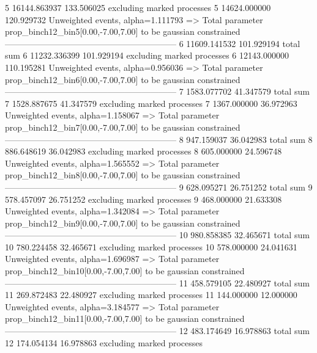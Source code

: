5          16144.863937    133.506025      excluding marked processes    
5          14624.000000    120.929732      Unweighted events, alpha=1.111793
  => Total parameter prop_binch12_bin5[0.00,-7.00,7.00] to be gaussian constrained
------------------------------------------------------------
6          11609.141532    101.929194      total sum                     
6          11232.336399    101.929194      excluding marked processes    
6          12143.000000    110.195281      Unweighted events, alpha=0.956036
  => Total parameter prop_binch12_bin6[0.00,-7.00,7.00] to be gaussian constrained
------------------------------------------------------------
7          1583.077702     41.347579       total sum                     
7          1528.887675     41.347579       excluding marked processes    
7          1367.000000     36.972963       Unweighted events, alpha=1.158067
  => Total parameter prop_binch12_bin7[0.00,-7.00,7.00] to be gaussian constrained
------------------------------------------------------------
8          947.159037      36.042983       total sum                     
8          886.648619      36.042983       excluding marked processes    
8          605.000000      24.596748       Unweighted events, alpha=1.565552
  => Total parameter prop_binch12_bin8[0.00,-7.00,7.00] to be gaussian constrained
------------------------------------------------------------
9          628.095271      26.751252       total sum                     
9          578.457097      26.751252       excluding marked processes    
9          468.000000      21.633308       Unweighted events, alpha=1.342084
  => Total parameter prop_binch12_bin9[0.00,-7.00,7.00] to be gaussian constrained
------------------------------------------------------------
10         980.858385      32.465671       total sum                     
10         780.224458      32.465671       excluding marked processes    
10         578.000000      24.041631       Unweighted events, alpha=1.696987
  => Total parameter prop_binch12_bin10[0.00,-7.00,7.00] to be gaussian constrained
------------------------------------------------------------
11         458.579105      22.480927       total sum                     
11         269.872483      22.480927       excluding marked processes    
11         144.000000      12.000000       Unweighted events, alpha=3.184577
  => Total parameter prop_binch12_bin11[0.00,-7.00,7.00] to be gaussian constrained
------------------------------------------------------------
12         483.174649      16.978863       total sum                     
12         174.054134      16.978863       excluding marked processes    
